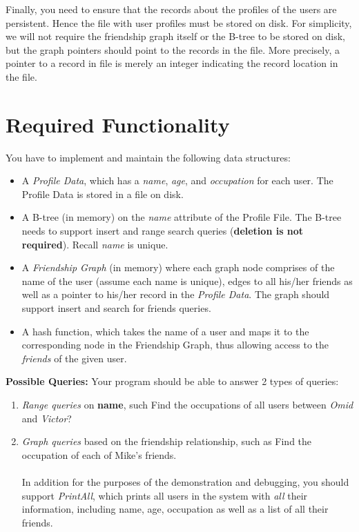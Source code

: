 \documentclass[times, 12pt]{article}
\begin{document}
Finally, you need to ensure that the records about the profiles of the users are persistent.  Hence the file with user profiles must be stored on disk.  For simplicity, we will not require the friendship graph itself or the B-tree to be stored on disk, but the graph pointers should point to the records in the file. More precisely, a pointer to a record in file is merely an integer indicating the record location in the file.

\section{Required Functionality}
You have to implement and maintain the following data structures:
\begin{itemize}
    \item A {\em Profile Data}, which has a {\em name}, {\em age}, and {\em occupation} for each user. The Profile Data is stored in a file on disk.
    \item A B-tree (in memory) on the {\em name} attribute of the Profile File. The B-tree needs to support insert and range search queries (\textbf{deletion is not required}). Recall {\em name} is unique.
    \item A {\em Friendship Graph} (in memory) where each graph node comprises of the name of the user (assume each name is unique), edges to all his/her friends as well as a pointer to his/her record in the {\em Profile Data}. The graph should support insert and search for friends queries.
    \item A hash function, which takes the name of a user and maps it to the corresponding node in the Friendship Graph, thus allowing access to the {\em friends} of the given user.
\end{itemize}
    
     
\textbf{Possible Queries: }Your program should be able to answer 2 types of queries:
\begin{enumerate}
    \item {\em Range queries} on {\bf name}, such Find the occupations of all users between {\em Omid} and {\em Victor}?
    \item {\em Graph queries} based on the friendship relationship, such as Find the occupation of each of Mike's friends.\\\\
    In addition for the purposes of the demonstration and debugging, you should support {\em PrintAll}, which prints all users in the system with {\em all} their information, including name, age, occupation as well as a list of all their friends.
\end{enumerate}
\newpage
\end{document}
